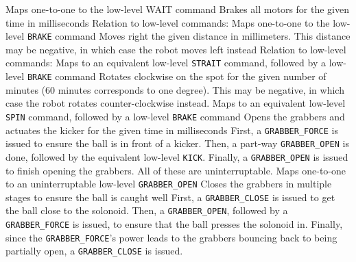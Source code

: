     {Maps one-to-one to the low-level WAIT command}
    {Brakes all motors for the given time in milliseconds}
    {Relation to low-level commands: Maps one-to-one to the low-level
     \texttt{BRAKE} command}
    {Moves right the given distance in millimeters. This distance may be
     negative, in which case the robot moves left instead}
    {Relation to low-level commands: Maps to an equivalent low-level
     \texttt{STRAIT} command, followed by a low-level \texttt{BRAKE} command}
    {Rotates clockwise on the spot for the given number of minutes (60 minutes
     corresponds to one degree). This may be negative, in which case the robot
     rotates counter-clockwise instead.}
    {Maps to an equivalent low-level \texttt{SPIN} command, followed by a
     low-level \texttt{BRAKE} command}
    {Opens the grabbers and actuates the kicker for the given time in
     milliseconds}
    {First, a \texttt{GRABBER\_FORCE} is issued to ensure the ball is in front
     of a kicker. Then, a part-way \texttt{GRABBER\_OPEN} is done, followed by
     the equivalent low-level \texttt{KICK}. Finally, a \texttt{GRABBER\_OPEN}
     is issued to finish opening the grabbers. All of these are
     uninterruptable.}
    {Maps one-to-one to an uninterruptable low-level \texttt{GRABBER\_OPEN}}
    {Closes the grabbers in multiple stages to ensure the ball is caught well}
    {First, a \texttt{GRABBER\_CLOSE} is issued to get the ball close to the
     solonoid.  Then, a \texttt{GRABBER\_OPEN}, followed by a
     \texttt{GRABBER\_FORCE} is issued, to ensure that the ball presses the
     solonoid in. Finally, since the \texttt{GRABBER\_FORCE}'s power leads to
     the grabbers bouncing back to being partially open, a
     \texttt{GRABBER\_CLOSE} is issued.}
